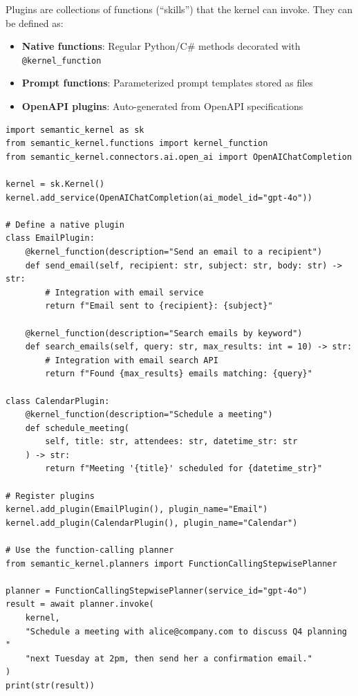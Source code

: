 Plugins are collections of functions (``skills'') that the kernel can invoke. They can be defined as:

\begin{itemize}
  \item \textbf{Native functions}: Regular Python/C\# methods decorated with \texttt{@kernel\_function}
  \item \textbf{Prompt functions}: Parameterized prompt templates stored as files
  \item \textbf{OpenAPI plugins}: Auto-generated from OpenAPI specifications
\end{itemize}

\begin{lstlisting}[style=pythonstyle, caption={Semantic Kernel plugin and planner}]
import semantic_kernel as sk
from semantic_kernel.functions import kernel_function
from semantic_kernel.connectors.ai.open_ai import OpenAIChatCompletion

kernel = sk.Kernel()
kernel.add_service(OpenAIChatCompletion(ai_model_id="gpt-4o"))

# Define a native plugin
class EmailPlugin:
    @kernel_function(description="Send an email to a recipient")
    def send_email(self, recipient: str, subject: str, body: str) -> str:
        # Integration with email service
        return f"Email sent to {recipient}: {subject}"

    @kernel_function(description="Search emails by keyword")
    def search_emails(self, query: str, max_results: int = 10) -> str:
        # Integration with email search API
        return f"Found {max_results} emails matching: {query}"

class CalendarPlugin:
    @kernel_function(description="Schedule a meeting")
    def schedule_meeting(
        self, title: str, attendees: str, datetime_str: str
    ) -> str:
        return f"Meeting '{title}' scheduled for {datetime_str}"

# Register plugins
kernel.add_plugin(EmailPlugin(), plugin_name="Email")
kernel.add_plugin(CalendarPlugin(), plugin_name="Calendar")

# Use the function-calling planner
from semantic_kernel.planners import FunctionCallingStepwisePlanner

planner = FunctionCallingStepwisePlanner(service_id="gpt-4o")
result = await planner.invoke(
    kernel,
    "Schedule a meeting with alice@company.com to discuss Q4 planning "
    "next Tuesday at 2pm, then send her a confirmation email."
)
print(str(result))
\end{lstlisting}

